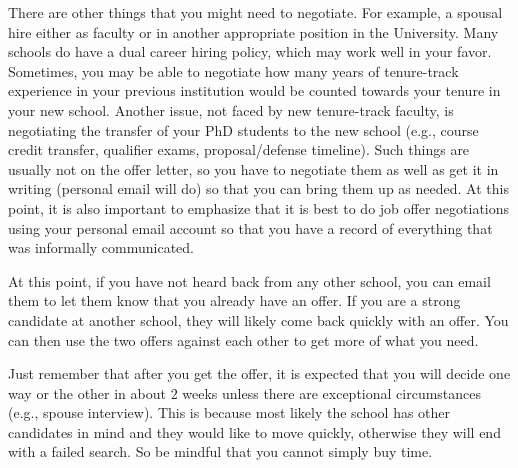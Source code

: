 \documentclass[14pt]{article}
\begin{document}
There are other things that you might need to negotiate. For example, a spousal hire either as faculty or in another appropriate position in the University. Many schools do have a dual career hiring policy, which may work well in your favor. Sometimes, you may be able to negotiate how many years of tenure-track experience in your previous institution would be counted towards your tenure in your new school. Another issue, not faced by new tenure-track faculty, is negotiating the transfer of your PhD students to the new school (e.g., course credit transfer, qualifier exams, proposal/defense timeline). Such things are usually not on the offer letter, so you have to negotiate them as well as get it in writing (personal email will do) so that you can bring them up as needed. At this point, it is also important to emphasize that it is best to do job offer negotiations using your personal email account so that you have a record of everything that was informally communicated. 

At this point, if you have not heard back from any other school, you can email them to let them know that you already have an offer. If you are a strong candidate at another school, they will likely come back quickly with an offer. You can then use the two offers against each other to get more of what you need.

Just remember that after you get the offer, it is expected that you will decide one way or the other in about $2$ weeks unless there are exceptional circumstances (e.g., spouse interview). This is because most likely the school has other candidates in mind and they would like to move quickly, otherwise they will end with a failed search. So be mindful that you cannot simply buy time. 



\end{document}

